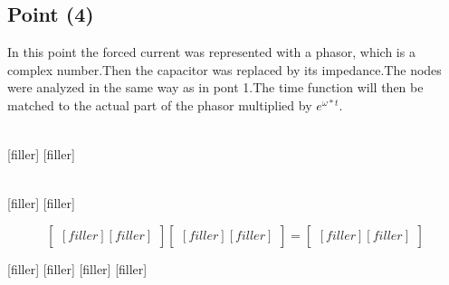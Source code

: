 
\subsection{Point (4)} 

In this point the forced current was represented with a phasor, which is a complex number.Then the capacitor was replaced by its impedance.The nodes were analyzed in the same way as in pont 1.The time function will then be matched to the actual part of the phasor multiplied by $e^{\omega*t}$. 

\begin{align*} 
[filler]
[filler]
\end{align*}

[filler]
[filler]

\begin{align*} 
[filler]
[filler]
\end{align*}

[filler]
[filler]


$$
\begin{bmatrix} 
[filler]
[filler]
\end {bmatrix} 
\begin{bmatrix}
[filler]
[filler]
\end{bmatrix}
=
\begin{bmatrix}
[filler]
[filler]
\end{bmatrix}
$$


[filler]
[filler]
[filler]
[filler]


%    

%   
